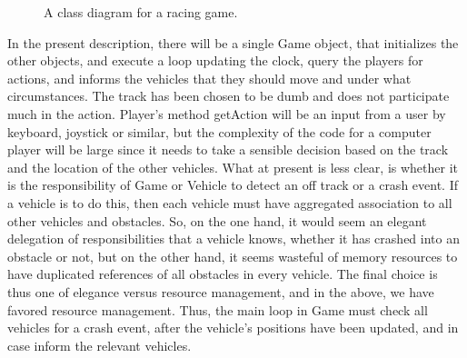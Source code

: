 \begin{description}
\begin{figure}
  \caption{A class diagram for a racing game.}
  \label{fig:race}
\end{figure}
\end{description}
In the present description, there will be a single Game object, that initializes the other objects, and execute a loop updating the clock, query the players for actions, and informs the vehicles that they should move and under what circumstances. The track has been chosen to be dumb and does not participate much in the action. Player's method getAction will be an input from a user by keyboard, joystick or similar, but the complexity of the code for a computer player will be large since it needs to take a sensible decision based on the track and the location of the other vehicles. What at present is less clear, is whether it is the responsibility of Game or Vehicle to detect an off track or a crash event. If a vehicle is to do this, then each vehicle must have aggregated association to all other vehicles and obstacles. So, on the one hand, it would seem an elegant delegation of responsibilities that a vehicle knows, whether it has crashed into an obstacle or not, but on the other hand, it seems wasteful of memory resources to have duplicated references of all obstacles in every vehicle. The final choice is thus one of elegance versus resource management, and in the above, we have favored resource management. Thus, the main loop in Game must check all vehicles for a crash event, after the vehicle's positions have been updated, and in case inform the relevant vehicles.

